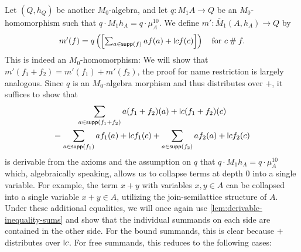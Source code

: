\documentclass[a4paper,UKenglish,cleveref,thm-restate,numberwithinsect,final]{lipics-v2021}
\newcommand{\fresh}{\mathbin{\#}}
\newcommand{\supp}{\mathsf{supp}}
\newcommand{\mbar}{\overline{M}_1}
\theoremstyle{plain}
\newcommand{\midmid}{\hspace{0.2ex}{\rule[-0.1ex]{0.6pt}{1.65ex}}\hspace{0.2ex}}
\newcommand{\newletter}[1]{{\midmid}#1}
\numberwithin{equation}{section}
\newcommand{\+}[1]{\mathcal{#1}\xspace}
\theoremstyle{definition}
\begin{document}
Let \((Q, h_Q)\) be another \(M_0\)-algebra, and let \(q\colon M_1A \to Q\) be an $M_0$-homomorphism such that \(q \cdot M_1h_A = q \cdot \mu^{10}_A\).
We define \(m'\colon \mbar(A, h_A) \to Q\) by
\begin{equation*}\textstyle
  m'(f) = q\left( \left[ \sum_{a \in \supp(f)} a f(a) + \newletter{c} f(c) \right] \right) \quad \text{for } c \fresh f.
\end{equation*}
This is indeed an \(M_0\)-homomorphism: We will show that \(m'(f_1 + f_2) = m'(f_1) + m'(f_2)\), the proof for name restriction is largely analogous.
Since $q$ is an $M_0$-algebra morphism and thus distributes over $+$, it suffices to show that
\begin{gather*}
  \sum_{a \in \supp(f_1 + f_2)} a (f_1 + f_2)(a) + \newletter{c} (f_1 + f_2)(c) \\
  = \sum_{a \in \supp(f_1)} a f_1(a) + \newletter{c} f_1(c) + \sum_{a \in \supp(f_2)} a f_2(a) + \newletter{c} f_2(c)
\end{gather*}
is derivable from the axioms and the
assumption on $q$ that $q \cdot M_1h_A = q \cdot \mu^{10}_A$ which, algebraically speaking, allows us to collapse terms at depth $0$ into a single variable. For example, the term $x+y$ with variables $x,y \in A$ can be collapsed into a single variable $x+y \in A$, utilizing the join-semilattice structure of $A$.
Under these additional equalities, we will once again use \cref{lem:derivable-inequality-sums} and show that the
individual summands on each side are contained in the other side.  For
the bound summands, this is clear because $+$ distributes over
$\newletter{c}$.  For free summands, this reduces to the following cases:
\end{document}
